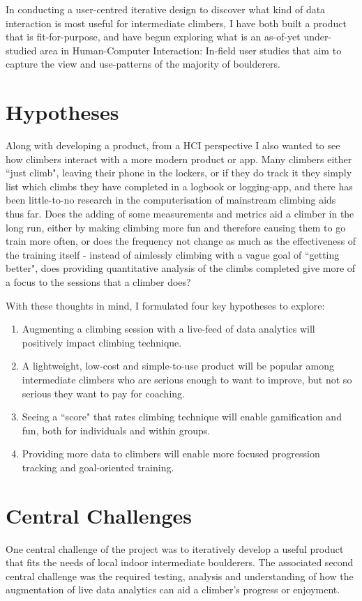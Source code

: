 In conducting a user-centred iterative design to discover what kind of data interaction is most useful for intermediate climbers, I have both built a product that is fit-for-purpose, and have begun exploring what is an as-of-yet under-studied area in Human-Computer Interaction:
In-field user studies that aim to capture the view and use-patterns of the majority of boulderers.



\section{Hypotheses}
Along with developing a product, from a HCI perspective I also wanted to see how climbers interact with a more modern product or app.
Many climbers either ``just climb", leaving their phone in the lockers, or if they do track it they simply list which climbs they have completed in a logbook or logging-app, and there has been little-to-no research in the computerisation of mainstream climbing aids thus far.
Does the adding of some measurements and metrics aid a climber in the long run,
either by making climbing more fun and therefore causing them to go train more often, or does the frequency not change as much as the effectiveness of the training itself - instead of aimlessly climbing with a vague goal of ``getting better", does providing quantitative analysis of the climbs completed give more of a focus to the sessions that a climber does?


With these thoughts in mind, I formulated four key hypotheses to explore:
\begin{enumerate}
    \item Augmenting a climbing session with a live-feed of data analytics will positively impact climbing technique.
    \item A lightweight, low-cost and simple-to-use product will be popular among intermediate climbers who are serious enough to want to improve, but not so serious they want to pay for coaching.
    \item Seeing a ``score" that rates climbing technique will enable gamification and fun, both for individuals and within groups.
    \item Providing more data to climbers will enable more focused progression tracking and goal-oriented training.
\end{enumerate}



\section{Central Challenges}
One central challenge of the project was to iteratively develop a useful product that fits the needs of local indoor intermediate boulderers.
The associated second central challenge was the required testing, analysis and understanding of how the augmentation of live data analytics can aid a climber's progress or enjoyment.


